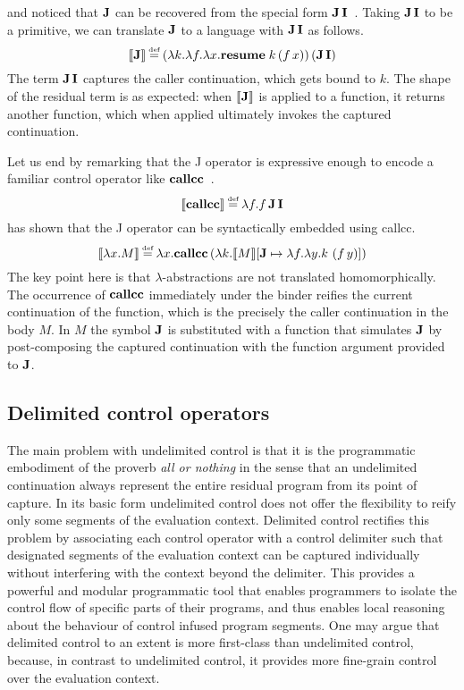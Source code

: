\documentclass[12pt,phd,lfcs,twoside,openright,logo,leftchapter,normalheadings]{infthesis}
\theoremstyle{plain}
\theoremstyle{definition}
\begin{document}
\citeauthor{Landin98} and \citeauthor{Thielecke02} noticed that $\mathbf{J}$
can be recovered from the special form
$\mathbf{J}\,\mathbf{I}$~\cite{Thielecke02}. Taking $\mathbf{J}\,\mathbf{I}$ to be a primitive, we can
translate $\mathbf{J}$ to a language with $\mathbf{J}\,\mathbf{I}$ as follows.
%
\[
  \sembr{\J} \defas (\lambda k.\lambda f.\lambda x.\Continue\;k\,(f\,x))\,(\JI)
\]
%
The term $\mathbf{J}\,\mathbf{I}$ captures the caller continuation, which gets bound to
$k$. The shape of the residual term is as expected: when $\llbracket \mathbf{J} \rrbracket$
is applied to a function, it returns another function, which when
applied ultimately invokes the captured continuation.
%

Let us end by remarking that the J operator is expressive enough to
encode a familiar control operator like $\mathbf{callcc}$~\cite{Thielecke98}.
%
\[
  \sembr{\Callcc} \defas \lambda f. f\,\JI
\]
%
\citet{Felleisen87b} has shown that the J operator can be
syntactically embedded using callcc.
%
\[
  \sembr{\lambda x.M} \defas \lambda x.\Callcc\,(\lambda k.\sembr{M}[\J \mapsto \lambda f.\lambda y. k~(f\,y)])
\]
%
The key point here is that $\lambda$-abstractions are not translated
homomorphically. The occurrence of $\mathbf{callcc}$ immediately under the
binder reifies the current continuation of the function, which is the
precisely the caller continuation in the body $M$. In $M$ the symbol
$\mathbf{J}$ is substituted with a function that simulates $\mathbf{J}$ by
post-composing the captured continuation with the function argument
provided to $\mathbf{J}$.

\subsection{Delimited control operators}
%
The main problem with undelimited control is that it is the
programmatic embodiment of the proverb \emph{all or nothing} in the
sense that an undelimited continuation always represent the entire
residual program from its point of capture. In its basic form
undelimited control does not offer the flexibility to reify only some
segments of the evaluation context.
%
Delimited control rectifies this problem by associating each control
operator with a control delimiter such that designated segments of the
evaluation context can be captured individually without interfering
with the context beyond the delimiter. This provides a powerful and
modular programmatic tool that enables programmers to isolate the
control flow of specific parts of their programs, and thus enables
local reasoning about the behaviour of control infused program
segments.
%
One may argue that delimited control to an extent is more first-class
than undelimited control, because, in contrast to undelimited control,
it provides more fine-grain control over the evaluation context.
%
\end{document}
